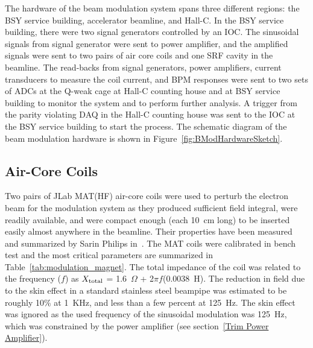 The hardware of the beam modulation system spans three different regions: the BSY service building, accelerator beamline, and Hall-C. In the BSY service building, there were two signal generators controlled by an IOC. The sinusoidal signals from signal generator were sent to power amplifier, and the amplified signals were sent to two pairs of air core coils and one SRF cavity in the beamline. The read-backs from signal generators, power amplifiers, current transducers to measure the coil current, and BPM responses were sent to two sets of ADCs at the Q-weak cage at Hall-C counting house and at BSY service building to monitor the system and to perform further analysis. A trigger from the parity violating DAQ in the Hall-C counting house was sent to the IOC at the BSY service building to start the process. The schematic diagram of the beam modulation hardware is shown in Figure~\ref{fig:BModHardwareSketch}.

\subsection{Air-Core Coils}
\label{Air-Core Coils}
Two pairs of JLab MAT(HF) air-core coils were used to perturb the electron beam for the modulation system as they produced sufficient field integral, were readily available, and were compact enough (each 10~cm long) to be inserted easily almost anywhere in the beamline. Their properties have been measured and summarized by Sarin Philips in~\cite{DocDB:sarin_979}. The MAT coils were calibrated in bench test and the most critical parameters are summarized in Table~\ref{tab:modulation_magnet}. The total impedance of the coil was related to the frequency ($f$) as $X_{\rm total}$ = 1.6~$\Omega$ + 2$\pi f$(0.0038~H). The reduction in field due to the skin effect in a standard stainless steel beampipe was estimated to be roughly 10\% at 1~KHz, and less than a few percent at 125~Hz. The skin effect was ignored as the used frequency of the sinusoidal modulation was 125~Hz, which was constrained by the power amplifier (see section~\ref{Trim Power Amplifier}). 

